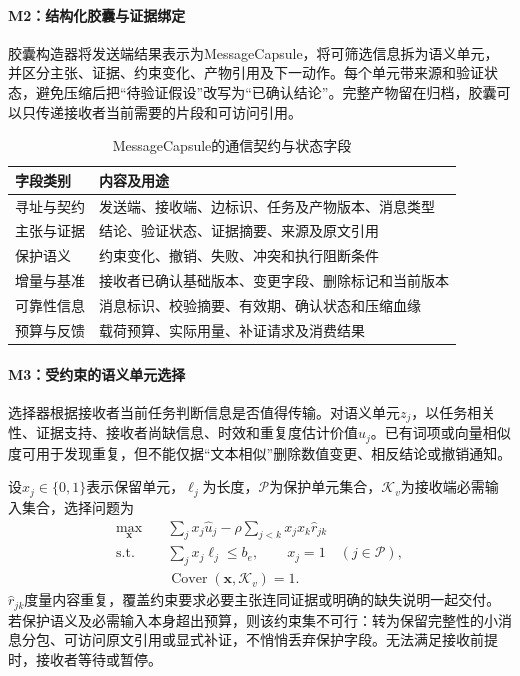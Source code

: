 \paragraph{M2：结构化胶囊与证据绑定}
胶囊构造器将发送端结果表示为MessageCapsule，将可筛选信息拆为语义单元，并区分主张、证据、约束变化、产物引用及下一动作。每个单元带来源和验证状态，避免压缩后把“待验证假设”改写为“已确认结论”。完整产物留在归档，胶囊可以只传递接收者当前需要的片段和可访问引用。

\begin{table}[htbp]
\centering
\caption{MessageCapsule的通信契约与状态字段}
\label{tab:mesh_capsule_fields}
\begin{tabular}{p{}p{}}
\toprule
字段类别 & 内容及用途 \\
\midrule
寻址与契约 & 发送端、接收端、边标识、任务及产物版本、消息类型 \\
主张与证据 & 结论、验证状态、证据摘要、来源及原文引用 \\
保护语义 & 约束变化、撤销、失败、冲突和执行阻断条件 \\
增量与基准 & 接收者已确认基础版本、变更字段、删除标记和当前版本 \\
可靠性信息 & 消息标识、校验摘要、有效期、确认状态和压缩血缘 \\
预算与反馈 & 载荷预算、实际用量、补证请求及消费结果 \\
\bottomrule
\end{tabular}
\end{table}

\paragraph{M3：受约束的语义单元选择}
选择器根据接收者当前任务判断信息是否值得传输。对语义单元$z_j$，以任务相关性、证据支持、接收者尚缺信息、时效和重复度估计价值$\widehat{u}_j$。已有词项或向量相似度可用于发现重复，但不能仅据“文本相似”删除数值变更、相反结论或撤销通知。

设$x_j\in\{0,1\}$表示保留单元，$\ell_j$为长度，$\mathcal{P}$为保护单元集合，$\mathcal{K}_v$为接收端必需输入集合，选择问题为
\begin{equation}
\begin{aligned}
\max_{\mathbf{x}}\quad &\sum_j x_j\widehat{u}_j
-\rho\sum_{j<k}x_jx_k\widehat{r}_{jk}\\
\mathrm{s.t.}\quad &\sum_jx_j\ell_j\leq b_e,\qquad
x_j=1\quad(j\in\mathcal{P}),\\
&\operatorname{Cover}(\mathbf{x},\mathcal{K}_v)=1.
\end{aligned}
\label{eq:mesh_semantic_selection}
\end{equation}
$\widehat{r}_{jk}$度量内容重复，覆盖约束要求必要主张连同证据或明确的缺失说明一起交付。若保护语义及必需输入本身超出预算，则该约束集不可行：转为保留完整性的小消息分包、可访问原文引用或显式补证，不悄悄丢弃保护字段。无法满足接收前提时，接收者等待或暂停。

